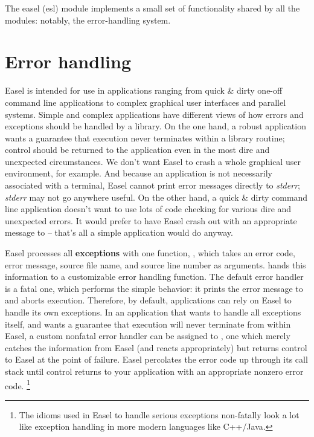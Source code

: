 The easel (esl) module implements a small set of functionality shared
by all the modules: notably, the error-handling system.

\section{Error handling}

Easel is intended for use in applications ranging from quick \& dirty
one-off command line applications to complex graphical user interfaces
and parallel systems. Simple and complex applications have different
views of how errors and exceptions should be handled by a library.  On
the one hand, a robust application wants a guarantee that execution
never terminates within a library routine; control should be returned
to the application even in the most dire and unexpected
circumstances. We don't want Easel to crash a whole graphical user
environment, for example. And because an application is not
necessarily associated with a terminal, Easel cannot print error
messages directly to \emph{stderr}; \emph{stderr} may not go anywhere
useful. On the other hand, a quick \& dirty command line application
doesn't want to use lots of code checking for various dire and
unexpected errors. It would prefer to have Easel crash out with an
appropriate message to  -- that's all a simple
application would do anyway.

Easel processes all \textbf{exceptions} with one function,
, which takes an error code, error message,
source file name, and source line number as arguments.
 hands this information to a customizable error
handling function. The default error handler is a fatal one, which
performs the simple behavior: it prints the error message to
 and aborts execution. Therefore, by default,
applications can rely on Easel to handle its own exceptions.  In an
application that wants to handle all exceptions itself, and wants a
guarantee that execution will never terminate from within Easel, a
custom nonfatal error handler can be assigned to ,
one which merely catches the information from Easel (and reacts
appropriately) but returns control to Easel at the point of
failure. Easel percolates the error code up through its call stack
until control returns to your application with an appropriate nonzero
error code. \footnote{The idioms used in Easel to handle serious
exceptions non-fatally look a lot like exception handling in more
modern languages like C++/Java.}

